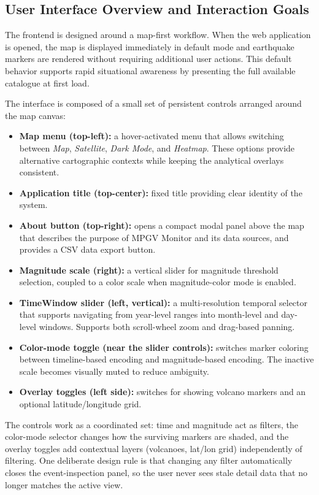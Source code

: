 \documentclass[12pt]{article}
\begin{document}
\subsection{User Interface Overview and Interaction Goals}
\label{subsec:frontend_ui_overview}

The frontend is designed around a map-first workflow. When the web application is opened, the map is displayed immediately in default mode and earthquake markers are rendered without requiring additional user actions. This default behavior supports rapid situational awareness by presenting the full available catalogue at first load.

The interface is composed of a small set of persistent controls arranged around the map canvas:

\begin{itemize}
    \item \textbf{Map menu (top-left):} a hover-activated menu that allows switching between \emph{Map}, \emph{Satellite}, \emph{Dark Mode}, and \emph{Heatmap}. These options provide alternative cartographic contexts while keeping the analytical overlays consistent.
    \item \textbf{Application title (top-center):} fixed title providing clear identity of the system.
    \item \textbf{About button (top-right):} opens a compact modal panel above the map that describes the purpose of MPGV Monitor and its data sources, and provides a CSV data export button.
    \item \textbf{Magnitude scale (right):} a vertical slider for magnitude threshold selection, coupled to a color scale when magnitude-color mode is enabled.
    \item \textbf{TimeWindow slider (left, vertical):} a multi-resolution temporal selector that supports navigating from year-level ranges into month-level and day-level windows. Supports both scroll-wheel zoom and drag-based panning.
    \item \textbf{Color-mode toggle (near the slider controls):} switches marker coloring between timeline-based encoding and magnitude-based encoding. The inactive scale becomes visually muted to reduce ambiguity.
    \item \textbf{Overlay toggles (left side):} switches for showing volcano markers and an optional latitude/longitude grid.
\end{itemize}

The controls work as a coordinated set: time and magnitude act as filters, the color-mode selector changes how the surviving markers are shaded, and the overlay toggles add contextual layers (volcanoes, lat/lon grid) independently of filtering. One deliberate design rule is that changing any filter automatically closes the event-inspection panel, so the user never sees stale detail data that no longer matches the active view.
\end{document}
